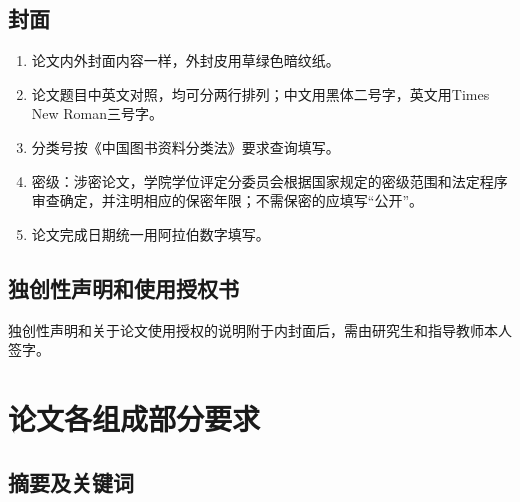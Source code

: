 \subsection{封面}

\begin{enumerate}[label=\arabic*)]
	\item 论文内外封面内容一样，外封皮用草绿色暗纹纸。
	
	\item 论文题目中英文对照，均可分两行排列；中文用黑体二号字，英文用Times New Roman三号字。
	
	\item 分类号按《中国图书资料分类法》要求查询填写。
	
	\item 密级：涉密论文，学院学位评定分委员会根据国家规定的密级范围和法定程序审查确定，并注明相应的保密年限；不需保密的应填写“公开”。
	
	\item 论文完成日期统一用阿拉伯数字填写。
\end{enumerate}


\subsection{独创性声明和使用授权书}

独创性声明和关于论文使用授权的说明附于内封面后，需由研究生和指导教师本人签字。


\section{论文各组成部分要求}

\subsection{摘要及关键词}

